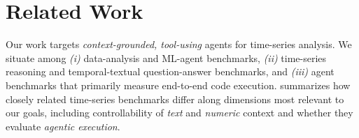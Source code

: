 \FloatBarrier
\section{Related Work}
\label{sec:related_work}
Our work targets \emph{context-grounded, tool-using} agents for time-series analysis.
We situate \name among \textit{(i)} data-analysis and ML-agent benchmarks, \textit{(ii)} time-series reasoning and temporal-textual question-answer benchmarks, and \textit{(iii)} agent benchmarks that primarily measure end-to-end code execution.
 summarizes how closely related time-series benchmarks differ along dimensions most relevant to our goals, including controllability of \emph{text} and \emph{numeric} context and whether they evaluate \emph{agentic execution}.

\begin{table}[t]
    \centering
    \footnotesize
    \setlength{\tabcolsep}{6pt}
    \renewcommand{\arraystretch}{1.12}
    \caption{Comparison with the most relevant benchmarks.
    ``Controlled textual context'' indicates whether the benchmark provides multiple versions of the same task with systematically varied levels of natural-language context.
    ``Controlled numerical context'' indicates whether the benchmark provides multiple versions of the same task with systematically varied exemplars or levels of access to the time series.
    ``uni'' stands for univariate, ``multi'' for multivariate.}
    \label{tab:benchmark_comparison}
    \NoHyper
\end{table}
